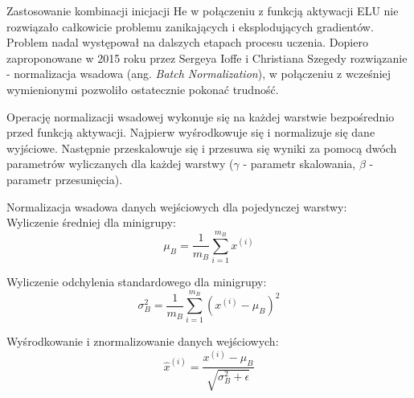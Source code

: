 \documentclass[a4paper,11pt]{article}
\begin{document}
    Zastosowanie kombinacji inicjacji He w połączeniu z funkcją aktywacji ELU nie rozwiązało całkowicie problemu zanikających i eksplodujących gradientów. Problem nadal występował na dalszych etapach procesu uczenia. Dopiero zaproponowane w 2015 roku przez Sergeya Ioffe i Christiana Szegedy rozwiązanie - normalizacja wsadowa (ang. \textit{Batch Normalization}), w połączeniu z wcześniej wymienionymi pozwoliło ostatecznie pokonać trudność\cite{BatchNormalization2015}.

    \bigskip

    Operację normalizacji wsadowej wykonuje się na każdej warstwie bezpośrednio przed funkcją aktywacji. Najpierw wyśrodkowuje się i normalizuje się dane wyjściowe. Następnie przeskalowuje się i przesuwa się wyniki za pomocą dwóch parametrów wyliczanych dla każdej warstwy ($\gamma$ - parametr skalowania, $\beta$ - parametr przesunięcia)\cite{UczenieMaszynowe2018}.

    \bigskip

    \noindent
    \begin{minipage}[H]{\textwidth}
        \setlength\parindent{17pt} Normalizacja wsadowa danych wejściowych dla pojedynczej warstwy: \\
        \bigskip
        \setlength\parindent{17pt} Wyliczenie średniej dla minigrupy: \\
        \begin{equation}
            \label{eq:minibatch_mean}
            \mu_{B} = \frac{1}{m_{B}} \displaystyle\sum_{i=1}^{m_{B}} x^{(i)}
        \end{equation}
    \end{minipage}

    \smallskip

    \noindent
    \begin{minipage}[H]{\textwidth}
        \setlength\parindent{17pt} Wyliczenie odchylenia standardowego dla minigrupy: \\
        \begin{equation}
            \label{eq:minibatch_std_dev}
            \sigma_{B}^{2} = \frac{1}{m_{B}} \displaystyle\sum_{i=1}^{m_{B}} (x^{(i)} - \mu_{B})^{2}
        \end{equation}
    \end{minipage}

    \smallskip

    \noindent
    \begin{minipage}[H]{\textwidth}
        \setlength\parindent{17pt} Wyśrodkowanie i znormalizowanie danych wejściowych: \\
        \begin{equation}
            \label{eq:centering_and_normalizing_input}
            \widehat{x}^{(i)} = \frac{x^{(i)} - \mu_{B}}{\sqrt{\sigma_{B}^{2} + \epsilon}}
        \end{equation}
    \end{minipage}
\end{document}
